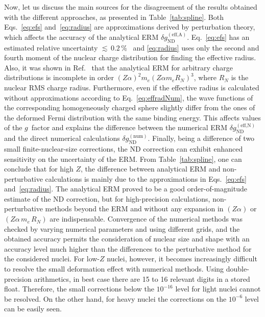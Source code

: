 Now, let us discuss the main sources for the disagreement of the results obtained with the different approaches, as presented in Table~\ref{tab:spline}. Both Eqs.~\eqref{eq:efs} and~\eqref{eq:radius} are approximations derived by perturbation theory, which affects the accuracy of the analytical ERM $\delta g_{\text{ND}}^{(\text{eff,A})}$. Eq.~\eqref{eq:efs} has an estimated relative uncertainty ${\scriptstyle\lesssim}\,0.2\,\%$~\cite{Shabaev1993} and \eqref{eq:radius} uses only the second and fourth moment of the nuclear charge distribution for finding the effective radius. Also, it was shown in Ref.~\cite{karshenboim2018} that the analytical ERM for arbitrary charge distributions is incomplete in order $(Z\alpha)^2m_e(Z\alpha m_e R_N)^3$, where $R_N$ is the nuclear RMS charge radius. Furthermore, even if the effective radius is calculated without approximations according to Eq.~\eqref{eq:effradNum}, the wave functions of the corresponding homogeneously charged sphere slightly differ from the ones of the deformed Fermi distribution with the same binding energy. This affects values of the $g$~factor and explains the difference between the numerical ERM $\delta g_{\text{ND}}^{(\text{eff,N})}$ and the direct numerical calculations $\delta g_{\text{ND}}^{(\text{num})}$. 
Finally, being a difference of two small finite-nuclear-size corrections, the ND correction can exhibit enhanced sensitivity on the uncertainty of the ERM.
From Table~\ref{tab:spline}, one can conclude that for high $Z$, the difference between analytical ERM and non-perturbative calculations is mainly due to the approximations in Eqs.~\eqref{eq:efs} and~\eqref{eq:radius}. The analytical ERM proved to be a good order-of-magnitude estimate of the ND correction, but for high-precision calculations, non-perturbative methods beyond the ERM and without any expansion in $(Z\alpha)$ or $(Z\alpha\, m_e\, R_N)$ are indispensable. Convergence of the numerical methods was checked by varying numerical parameters and using different grids, and the obtained accuracy permits the consideration of nuclear size and shape with an accuracy level much higher than the differences to the perturbative method for the considered nuclei. For low-$Z$ nuclei, however, it becomes increasingly difficult to resolve the small deformation effect with numerical methods. Using double-precision arithmetics, in best case there are 15 to 16 relevant digits in a stored float. Therefore, the small corrections below the $10^{-16}$ level for light nuclei cannot be resolved. On the other hand, for heavy nuclei the corrections on the $10^{-6}$ level can be easily seen.\\

